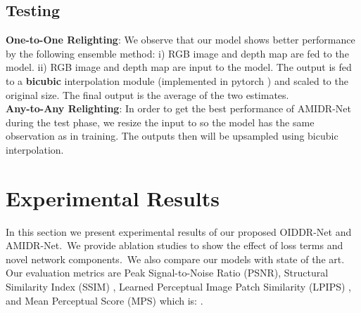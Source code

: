 \documentclass[final]{cvpr}
\newcommand{\smallsqueezeup}{\vspace{-2mm}}
\begin{document}
\subsection{Testing}
 \textbf{One-to-One Relighting}: We observe that our model shows better performance by the following ensemble method:
i)  RGB image and depth map are fed to the model. ii)  RGB image and depth map are input to the model. The output is fed to a \textbf{bicubic} interpolation module (implemented in pytorch \cite{51}) and scaled to the original size. The final output is the average of the two estimates.\\
\textbf{Any-to-Any Relighting}:
In order to get the best performance of AMIDR-Net during the test phase, we resize the input to  so the model has the same observation as in training. The outputs then will be upsampled using bicubic interpolation.\smallsqueezeup  
\section{Experimental Results}
In this section we present experimental results of our proposed OIDDR-Net and AMIDR-Net.\ We provide ablation studies to show the effect of loss terms and novel network components.\ We also compare our models with state of the art. Our evaluation metrics are Peak Signal-to-Noise Ratio (PSNR), Structural Similarity Index (SSIM) \cite{57}, Learned Perceptual Image Patch Similarity (LPIPS) \cite{52}, and Mean Perceptual Score (MPS) which is: .\smallsqueezeup
\begin{table}[]
\small
\caption{One-to-one-VIDIT'21 validation's ablation study.}
\smallsqueezeup
\label{tb:ablation1}
    \centering
    \label{tab:my_label}
    \smallsqueezeup
    \smallsqueezeup
\end{table}
\end{document}
